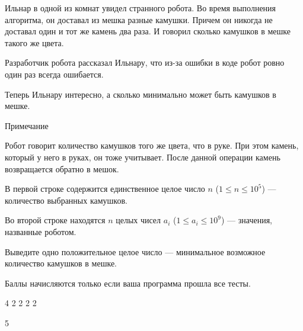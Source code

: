 
Ильнар в одной из комнат увидел странного робота. Во время выполнения алгоритма, он доставал из мешка разные камушки. 
Причем он никогда не доставал один и тот же камень два раза. И говорил сколько камушков в мешке такого же цвета.

Разработчик робота рассказал Ильнару, что из-за ошибки в коде робот ровно один раз всегда ошибается.

Теперь Ильнару интересно, а сколько минимально может быть камушков в мешке.

Примечание

Робот говорит количество камушков того же цвета, что в руке. При этом камень, который у него в руках, он тоже учитывает. После данной операции камень возвращается обратно в мешок.


В первой строке содержится единственное целое число $n$ ($1 \leq n \leq 10^5$) — количество выбранных камушков.

Во второй строке находятся $n$ целых чисел $a_i$ ($1 \leq a_i \leq 10^9$) — значения, названные роботом.

\outputfmtSection

Выведите одно положительное целое число — минимальное возможное количество камушков в мешке.

\markSection

Баллы начисляются только если ваша программа прошла все тесты.


\begin{myverbbox}[\small]{\vinput}
    4
    2 2 2 2
\end{myverbbox}
\begin{myverbbox}[\small]{\voutput}
    5
\end{myverbbox}

